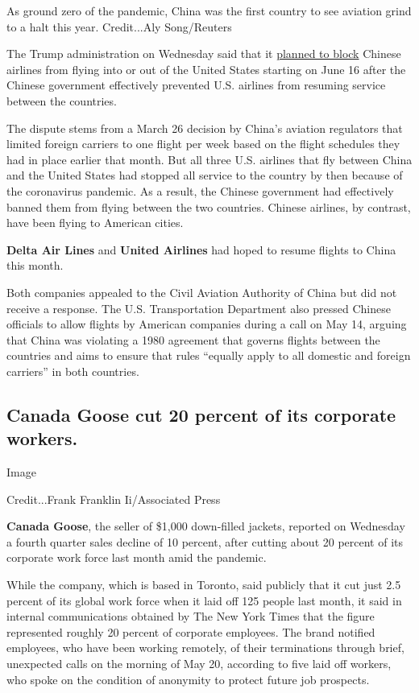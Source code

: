 As ground zero of the pandemic, China was the first country to see
aviation grind to a halt this year. Credit...Aly Song/Reuters

The Trump administration on Wednesday said that it
\href{https://www.nytimes3xbfgragh.onion/2020/06/03/business/trump-blocks-chinese-airlines.html}{planned
to block} Chinese airlines from flying into or out of the United States
starting on June 16 after the Chinese government effectively prevented
U.S. airlines from resuming service between the countries.

The dispute stems from a March 26 decision by China's aviation
regulators that limited foreign carriers to one flight per week based on
the flight schedules they had in place earlier that month. But all three
U.S. airlines that fly between China and the United States had stopped
all service to the country by then because of the coronavirus pandemic.
As a result, the Chinese government had effectively banned them from
flying between the two countries. Chinese airlines, by contrast, have
been flying to American cities.

\textbf{Delta Air Lines} and \textbf{United Airlines} had hoped to
resume flights to China this month.

Both companies appealed to the Civil Aviation Authority of China but did
not receive a response. The U.S. Transportation Department also pressed
Chinese officials to allow flights by American companies during a call
on May 14, arguing that China was violating a 1980 agreement that
governs flights between the countries and aims to ensure that rules
``equally apply to all domestic and foreign carriers'' in both
countries.

\hypertarget{canada-goose-cut-20-percent-of-its-corporate-workers}{%
\subsection{Canada Goose cut 20 percent of its corporate
workers.}\label{canada-goose-cut-20-percent-of-its-corporate-workers}}

Image

Credit...Frank Franklin Ii/Associated Press

\textbf{Canada Goose}, the seller of \$1,000 down-filled jackets,
reported on Wednesday a fourth quarter sales decline of 10 percent,
after cutting about 20 percent of its corporate work force last month
amid the pandemic.

While the company, which is based in Toronto, said publicly that it cut
just 2.5 percent of its global work force when it laid off 125 people
last month, it said in internal communications obtained by The New York
Times that the figure represented roughly 20 percent of corporate
employees. The brand notified employees, who have been working remotely,
of their terminations through brief, unexpected calls on the morning of
May 20, according to five laid off workers, who spoke on the condition
of anonymity to protect future job prospects.

